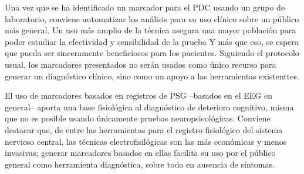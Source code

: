 %

Una vez que se ha identificado un marcador para el PDC usando un grupo de laboratorio,
conviene automatizar los análisis para su uso clínico sobre un público más general.
%
Un uso más amplio de la técnica asegura una mayor población para poder estudiar la 
efectividad y sensibilidad de la prueba
Y más que eso, se espera que pueda ser sinceramente beneficiosos para los pacientes. Siguiendo el
protocolo usual, los marcadores presentados no serán usados como único recurso para generar
un diagnóstico clínico, sino como un apoyo a las herramientas existenttes.

El uso de marcadores basados en registros de PSG --basados en el EEG en general-- aporta una
base fisiológica al diagnóstico de deterioro cognitivo, misma que no es posible usando
únicamente pruebas neuropsicológicas.
%
Conviene destacar que, de entre las herramientas para el registro fisiológico del sistema nervioso
central, las técnicas electrofisilógicas son las más económicas y menos invasivas;
generar marcadores basados en ellas facilita su uso por el público general como herramienta 
diagnóstica, sobre todo en ausencia de síntomas.



